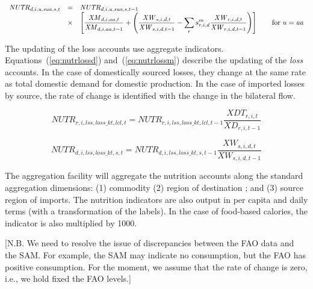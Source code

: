 \documentclass[11pt,letterpaper]{report}
\begin{document}
\begin{equation}
\label{eq:nutrm}
\begin{array}{l c l}
\mathit{NUTR}_{d,i,u,\mathit{sua},s,t}  & = &
\mathit{NUTR}_{d,i,u,\mathit{sua},s,t-1} \\
{} & {\times} & \left[\displaystyle \frac{\mathit{XM}_{d,i,aa,t}}{\mathit{XM}_{d,i,aa,t-1}}
+\left(
\frac{\mathit{XW}_{s,i,d,t}}{\mathit{XW}_{s,i,d,t-1}}
- \sum_{r}{s^m_{r,i,d}\frac{\mathit{XW}_{r,i,d,t}}{\mathit{XW}_{r,i,d,t-1}}}
\right)\right]
\qquad \textnormal{for } u = \mathit{aa} \\
\end{array}
\end{equation}

The updating of the loss accounts use aggregate indicators.
Equations~(\ref{eq:nutrlossd}) and~(\ref{eq:nutrlossm})
describe the updating of the \emph{loss} accounts.
In the case of domestically sourced losses, they change
at the same rate as total domestic demand for domestic
production. In the case of imported losses by source, the rate
of change is identified with the change in the bilateral flow.

\begin{equation}
\label{eq:nutrlossd}
\mathit{NUTR}_{r,i,\mathit{lss},\mathit{loss\_kt},\mathit{lcl},t} =
\mathit{NUTR}_{r,i,\mathit{lss},\mathit{loss\_kt},\mathit{lcl},t-1}
\displaystyle \frac{\mathit{XDT}_{r,i,t}}{\mathit{XD}_{r,i,t-1}}
\end{equation}

\begin{equation}
\label{eq:nutrlossm}
\mathit{NUTR}_{d,i,\mathit{lss},\mathit{loss\_kt},s,t} =
\mathit{NUTR}_{d,i,\mathit{lss},\mathit{loss\_kt},s,t-1}
\displaystyle \frac{\mathit{XW}_{s,i,d,t}}{\mathit{XW}_{s,i,d,t-1}}
\end{equation}

The aggregation facility will aggregate the nutrition accounts
along the standard aggregation dimensions: (1) commodity
(2) region of destination ; and (3) source region of imports.
The nutrition indicators are also output in
per capita and daily terms (with a transformation of the labels).
In the case of food-based calories, the indicator is also
multiplied by 1000.

[N.B. We need to resolve the issue of discrepancies between
the FAO data and the SAM. For example, the SAM may indicate
no consumption, but the FAO has positive consumption. For the
moment, we assume that the rate of change is zero, i.e.,
we hold fixed the FAO levels.]
\end{document}

